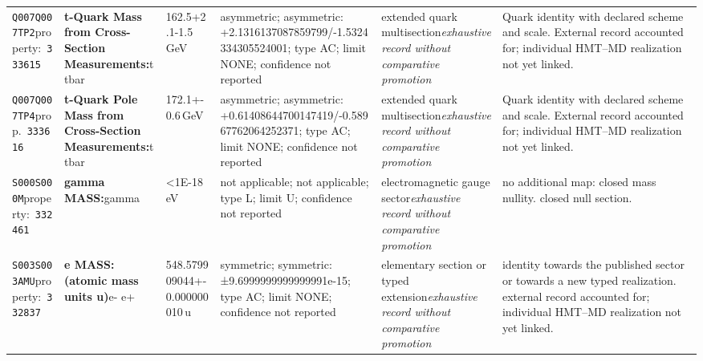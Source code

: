 \begin{landscape}
\begin{longtable}{L{1.85cm}L{4.45cm}L{2.35cm}L{4.05cm}L{3.35cm}L{7.15cm}}
\texttt{Q007}\newline \texttt{Q007TP2}\newline property:\ \texttt{333615} & \textbf{t-Quark Mass from Cross-Section Measurements:}\newline t \textbar{}\allowbreak{} tbar & 162.5+2.1-1.5\,GeV & asymmetric; asymmetric: +2.1316137087859799/-1.5324334305524001; type AC; limit NONE; confidence not reported & extended quark multisection\newline \emph{exhaustive record without comparative promotion} & Quark identity with declared scheme and scale. External record accounted for; individual HMT--MD realization not yet linked. \\
\texttt{Q007}\newline \texttt{Q007TP4}\newline prop.\ \texttt{333616} & \textbf{t-Quark Pole Mass from Cross-Section Measurements:}\newline t \textbar{}\allowbreak{} tbar & 172.1+-0.6\,GeV & asymmetric; asymmetric: +0.61408644700147419/-0.58967762064252371; type AC; limit NONE; confidence not reported & extended quark multisection\newline \emph{exhaustive record without comparative promotion} & Quark identity with declared scheme and scale. External record accounted for; individual HMT--MD realization not yet linked. \\
\texttt{S000}\newline \texttt{S000M}\newline property:\ \texttt{332461} & \textbf{gamma MASS:}\newline gamma & \textless{}1E-18\,eV & not applicable; not applicable; type L; limit U; confidence not reported & electromagnetic gauge sector\newline \emph{exhaustive record without comparative promotion} & no additional map: closed mass nullity. closed null section. \\
\texttt{S003}\newline \texttt{S003AMU}\newline property:\ \texttt{332837} & \textbf{e MASS: (atomic mass units u)}\newline e- \textbar{}\allowbreak{} e+ & 548.579909044+-0.000000010\,u & symmetric; symmetric: ±9.6999999999999991e-15; type AC; limit NONE; confidence not reported & elementary section or typed extension\newline \emph{exhaustive record without comparative promotion} & identity towards the published sector or towards a new typed realization. external record accounted for; individual HMT--MD realization not yet linked. \\

\end{longtable}
\end{landscape}
